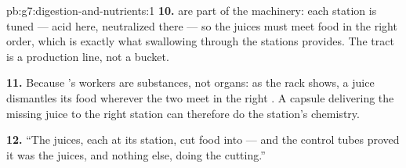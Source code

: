 \begin{solution}{pb:g7:digestion-and-nutrients:1}
\textbf{10.}  are part of the machinery: each
station is tuned --- acid here, neutralized there --- so
the juices must meet food in the right order, which is
exactly what swallowing through the stations provides.
The tract is a production line, not a bucket.

\textbf{11.} Because 's workers are substances,
not organs: as the rack shows, a juice dismantles its
food wherever the two meet in the right . A
capsule delivering the missing juice to the right
station can therefore do the station's chemistry.

\textbf{12.} ``The juices, each at its station, cut food
into  --- and the control tubes proved it was
the juices, and nothing else, doing the cutting.''
\end{solution}
